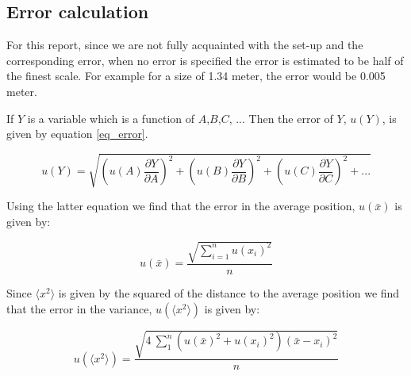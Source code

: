 \subsection{Error calculation}

For this report, since we are not fully acquainted with the set-up and the corresponding error, when no error is specified the error is estimated to be half of the finest scale. For example for a size of 1.34 meter, the error would be 0.005 meter.

If $Y$ is a variable which is a function of $A$,$B$,$C$, ... Then the error of $Y$, $u(Y)$, is given by equation \ref{eq_error}.

\begin{equation}
	\label{eq_error}
	u(Y) = \sqrt{\left(u(A) \frac{\partial Y}{\partial A}\right)^2 + \left(u(B) \frac{\partial Y}{\partial B}\right)^2 + \left(u(C) \frac{\partial Y}{\partial C}\right)^2 + ...}
\end{equation}

Using the latter equation we find that the error in the average position, $u(\bar{x})$ is given by:

\begin{equation}
	u(\bar{x}) =  \frac{ \sqrt{ \sum_{i=1}^n u(x_i)^2}}{n} 
\end{equation}

Since $ \langle x^2 \rangle $ is given by the squared of the distance to the average position we find that the error in the variance, $u( \langle x^2 \rangle ) $ is given by:

\begin{equation}
	u( \langle x^2 \rangle ) =  \frac{ \sqrt{ 4 \: \sum_1^n    \left( u(\bar{x})^2 + u(x_i)^2 \right) \left( \bar{x} - x_i \right)^2}}{n}
\end{equation}





